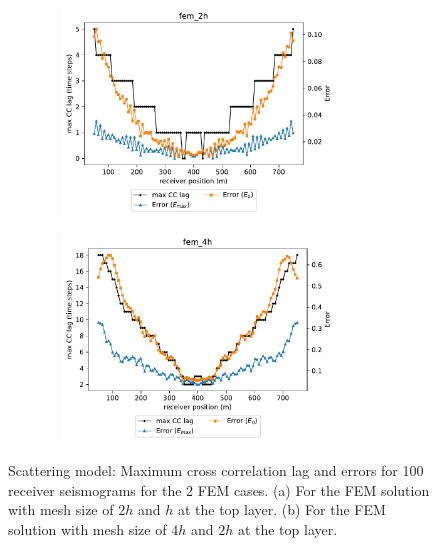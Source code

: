  \begin{figure}[h!]
 		\centering
		\begin{subfigure}{8cm}
				\includegraphics[width=8cm, height=5.5cm]{Thesis_Edith/figures/scattering/scat_waves/Err_fem_2h.pdf}
			     \caption{}
		\end{subfigure}
        \hspace{0.25cm}	
		\begin{subfigure}{8cm}
				\includegraphics[width=8cm, height=5.5cm]{Thesis_Edith/figures/scattering/scat_waves/Err_fem_4h.pdf}
			   \caption{}
		\end{subfigure}
 
	\caption{Scattering model: Maximum cross correlation lag and errors for 100 receiver seismograms for the 2 FEM cases. (a) For the FEM solution with mesh size of $2h$ and $h$ at the top layer. (b) For the FEM solution with mesh size of $4h$ and $2h$ at the top layer.}
	\label{fig:3.32}
\end{figure}

